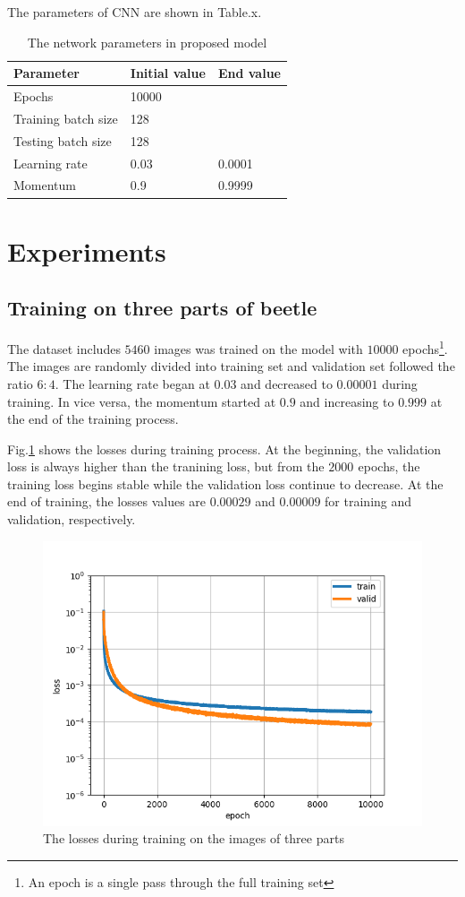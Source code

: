 \documentclass[12pt,a4paper]{article}
\begin{document}
The parameters of CNN are shown in Table.x.
\begin{table}[h!]
	\centering
	\begin{tabular}{l l l}
	Parameter & Initial value & End value \\ \hline
	Epochs & 10000 &  \\ \hline
	Training batch size & 128 & \\ \hline
	Testing batch size & 128 & \\ \hline
	Learning rate & 0.03 & 0.0001 \\ \hline
	Momentum & 0.9 & 0.9999 \\ \hline
	\end{tabular}
	\caption{The network parameters in proposed model}
	\label{model2parameters}
\end{table}
\section{Experiments}
\subsection{Training on three parts of beetle}
The dataset includes $5460$ images was trained on the model with $10000$ epochs\footnote{An epoch is a single pass through the full training set}. The images are randomly divided into training set and validation set followed the ratio $6:4$. The learning rate began at $0.03$ and decreased to $0.00001$ during training. In vice versa, the momentum started at $0.9$ and increasing to $0.999$ at the end of the training process. 

Fig.\ref{figlossallparts} shows the losses during training process. At the beginning, the validation loss is always higher than the tranining loss, but from the $2000^{}$ epochs, the training loss begins stable while the validation loss continue to decrease. At the end of training, the losses values are $0.00029$ and $0.00009$ for training and validation, respectively.

\begin{figure}[h!]
	\centering
	\includegraphics[scale=0.6]{images/all_parts_10000epochs}
	\caption{The losses during training on the images of three parts}
	\label{figlossallparts}
\end{figure}
\end{document}
